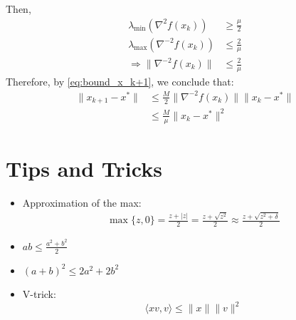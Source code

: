 \documentclass[12pt, openany]{report}
\theoremstyle{definition}
\begin{document}
Then,
\begin{equation}
	\begin{aligned}
		\lambda_{\min}(\nabla^2 f(x_k)) &\geq \frac{\mu}{2}\\
		\lambda_{\max}(\nabla^{-2} f(x_k)) &\leq \frac{2}{\mu}\\
		\Rightarrow \|\nabla^{-2} f(x_k)\| &\leq \frac{2}{\mu}
	\end{aligned}
\end{equation}
Therefore, by \eqref{eq:bound_x_k+1}, we conclude that:
\begin{equation}
	\begin{aligned}
		\|x_{k+1}-x^*\| &\leq \frac{M}{2}\|\nabla^{-2}f(x_k)\|\|x_k-x^*\|\\
		&\leq \frac{M}{\mu}\|x_k-x^*\|^2
	\end{aligned}
\end{equation}


\chapter{Tips and Tricks}
\begin{itemize}
	\item Approximation of the max:
	\begin{equation}
		\begin{aligned}
			\max\{z,0\} = \frac{z+|z|}{2} = \frac{z + \sqrt{z^2}}{2} \approx \frac{z + \sqrt{z^2 + \delta}}{2}
		\end{aligned}	
	\end{equation}
	\item $ab \leq \frac{a^2+b^2}{2}$
	\item $(a+b)^2 \leq 2a^2+2b^2$
	\item V-trick:
	\begin{equation}\label{eq:vtrick}
		\langle xv,v\rangle \leq \|x\|\|v\|^2
	\end{equation}
	
\end{itemize}
\end{document}
